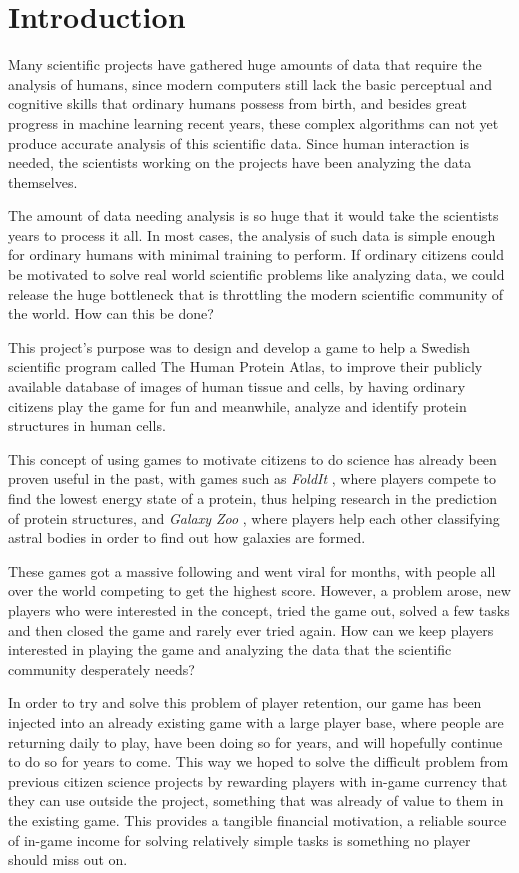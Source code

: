 \section{Introduction}\label{sec:introduction}

Many scientific projects have gathered huge amounts of data that require the analysis of humans, since modern computers still lack the basic perceptual and cognitive skills that ordinary humans possess from birth, and besides great progress in machine learning recent years, these complex algorithms can not yet produce accurate analysis of this scientific data. Since human interaction is needed, the scientists working on the projects have been analyzing the data themselves.

The amount of data needing analysis is so huge that it would take the scientists years to process it all. In most cases, the analysis of such data is simple enough for ordinary humans with minimal training to perform. If ordinary citizens could be motivated to solve real world scientific problems like analyzing data, we could release the huge bottleneck that is throttling the modern scientific community of the world. How can this be done?

This project's purpose was to design and develop a game to help a Swedish scientific program called The Human Protein Atlas, to improve their publicly available database of images of human tissue and cells, by having ordinary citizens play the game for fun and meanwhile, analyze and identify protein structures in human cells.

This concept of using games to motivate citizens to do science has already been proven useful in the past, with games such as \emph{FoldIt} \cite{foldit}, where players compete to find the lowest energy state of a protein, thus helping research in the prediction of protein structures, and \emph{Galaxy Zoo} \cite{galaxyzoo}, where players help each other classifying astral bodies in order to find out how galaxies are formed.

These games got a massive following and went viral for months, with people all over the world competing to get the highest score. However, a problem arose, new players who were interested in the concept, tried the game out, solved a few tasks and then closed the game and rarely ever tried again. How can we keep players interested in playing the game and analyzing the data that the scientific community desperately needs?

In order to try and solve this problem of player retention, our game has been injected into an already existing game with a large player base, where people are returning daily to play, have been doing so for years, and will hopefully continue to do so for years to come. This way we hoped to solve the difficult problem from previous citizen science projects by rewarding players with in-game currency that they can use outside the project, something that was already of value to them in the existing game. This provides a tangible financial motivation, a reliable source of in-game income for solving relatively simple tasks is something no player should miss out on.

